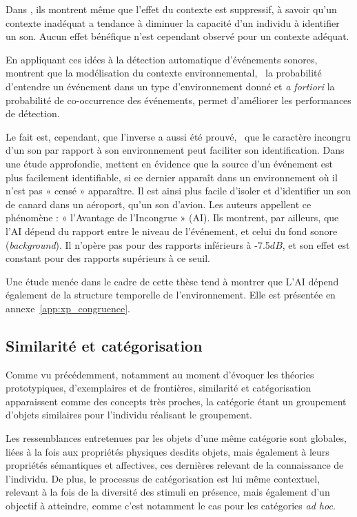 Dans \citep{ballas1991effects}, ils montrent même que l'effet du contexte est suppressif, à savoir qu'un contexte inadéquat a tendance à diminuer la capacité d'un individu à identifier un son. Aucun effet bénéfique n'est cependant observé pour un contexte adéquat.

En appliquant ces idées à la détection automatique d'événements sonores, \citep{niessen2008disambiguating} montrent que la modélisation du contexte environnemental, \ie~la probabilité d'entendre un événement dans un type d'environnement donné et \emph{a fortiori} la probabilité de co-occurrence des événements, permet d'améliorer les performances de détection. 

Le fait est, cependant, que l'inverse a aussi été prouvé, \ie~que le caractère incongru d'un son par rapport à son environnement peut faciliter son identification. Dans une étude approfondie, \citep{gygi2011incongruency} mettent en évidence que la source d'un événement est plus facilement identifiable, si ce dernier apparaît dans un environnement où il n'est pas « censé » apparaître. Il est ainsi plus facile d'isoler et d'identifier un son de canard dans un aéroport, qu'un son d'avion. Les auteurs appellent ce phénomène : « l'Avantage de l'Incongrue » (AI). Ils montrent, par ailleurs, que l'AI dépend du rapport entre le niveau de l'événement, et celui du fond sonore (\emph{background}). Il n'opère pas pour des rapports inférieurs à -7.5$dB$, et son effet est constant pour des rapports supérieurs à ce seuil.

Une étude menée dans le cadre de cette thèse tend à montrer que L'AI dépend également de la structure temporelle de l'environnement. Elle est présentée en annexe~\ref{app:xp_congruence}. 

\subsection{Similarité et catégorisation}

Comme vu précédemment, notamment au moment d'évoquer les théories prototypiques, d'exemplaires et de frontières, similarité et catégorisation apparaissent comme des concepts très proches, la catégorie étant un groupement d'objets similaires pour l'individu réalisant le groupement.

Les ressemblances entretenues par les objets d'une même catégorie sont globales, liées à la fois aux propriétés physiques desdits objets, mais également à leurs propriétés sémantiques et affectives, ces dernières relevant de la connaissance de l'individu. De plus, le processus de catégorisation est lui même contextuel, relevant à la fois de la diversité des stimuli en présence, mais également d'un objectif à atteindre, comme c'est notamment le cas pour les catégories \emph{ad hoc}.

